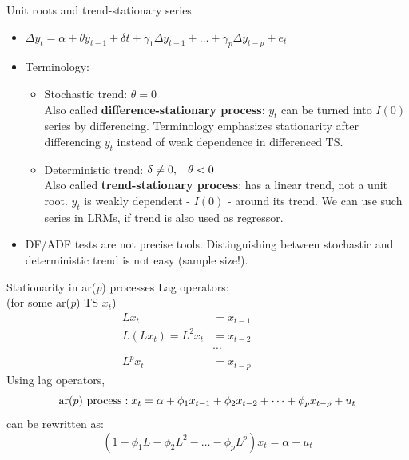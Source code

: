 \documentclass{beamer}
\begin{document}
\begin{frame}{Unit roots and trend-stationary series}
\begin{itemize}
\item $ \Delta y_t = \alpha  + \theta y_{t-1} + \delta t + \gamma_1\Delta y_{t-1}+\dots+\gamma_p\Delta y_{t-p}+e_t$
\vspace{0.2cm}
\item Terminology:
\vspace{0.2cm}
\begin{itemize}
\item Stochastic trend: $\theta=0$ \\
Also called \textbf{difference-stationary process}: $y_t$ can be turned into $I(0)$ series by differencing. Terminology emphasizes stationarity after differencing $y_t$ instead of weak dependence in differenced TS.
\vspace{0.2cm}
\item Deterministic trend: $\delta \neq 0, \hspace{0.3cm} \theta<0$ \\
Also called \textbf{trend-stationary process}: has a linear trend, not a unit root. $y_t$ is weakly dependent - $I(0)$ - around its trend. We can use such series in LRMs, if trend is also used as regressor.
\end{itemize}
\vspace{0.3cm}
\item DF/ADF tests are not precise tools. Distinguishing between stochastic and deterministic trend is not easy (sample size!). 
\end{itemize}
\end{frame}
\begin{frame}{Stationarity in ar(\textit{p}) processes}
Lag operators:\\ (for some ar(\textit{p}) TS $x_t$)
\begin{align*}
Lx_t &= x_{t-1} \\
L(Lx_t)=L^2x_t &= x_{t-2} ~~~~~~~~~~~~~~~~~\\
&\cdots \\
L^p x_t &= x_{t-p} 
\end{align*}
Using lag operators,
$$ \textnormal{ar}(p) \textnormal{~process}:  x_t = \alpha + \phi_1 x_{t-1} + \phi_2 x_{t-2} +\dots + \phi_p
  x_{t-p}+u_t$$
can be rewritten as: 
$$(1-\phi_1 L - \phi_2 L^2 - \dots - \phi_p L^p)x_t = \alpha + u_t $$
\end{frame}
\end{document}
